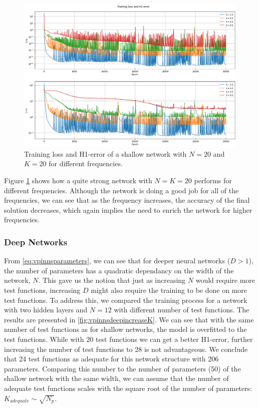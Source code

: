 \begin{figure}[h!]
    \centering
    \includegraphics[width=.7\textwidth]{img/VPINN-Comparison-NK20increasek.png}
    \caption{Training loss and H1-error of a shallow network with $N=20$ and $K=20$ for different frequencies.}
    \label{fig:vpinnsincreasefreq}
\end{figure}

Figure \ref{fig:vpinnsincreasefreq} shows how a quite strong network with $N=K=20$ performs for different frequencies. Although the network is doing a good job for all of the frequencies, we can see that as the frequency increases, the accuracy of the final solution decreases, which again implies the need to enrich the network for higher frequencies.

\subsubsection{Deep Networks}\label{seq:deepnetworks}
From \autoref{eq:vpinnsparameters}, we can see that for deeper neural networks ($D>1$), the number of parameters has a quadratic dependancy on the width of the network, $N$. This gave us the notion that just as increasing $N$ would require more test functions, increasing $D$ might also require the training to be done on more test functions. To address this, we compared the training process for a network with two hidden layers and $N=12$ with different number of test functions. The results are presented in \autoref{fig:vpinnsdeepincreaseK}. We can see that with the same number of test functions as for shallow networks, the model is overfitted to the test functions. While with 20 test functions we can get a better H1-error, further increasing the number of test functions to 28 is not advantageous. We conclude that 24 test functions as adequate for this network structure with 206 parameters. Comparing this number to the number of parameters (50) of the shallow network with the same width, we can assume that the number of adequate test functions scales with the square root of the number of parameters: $K_{adequate} \sim \sqrt{N_p}$.

